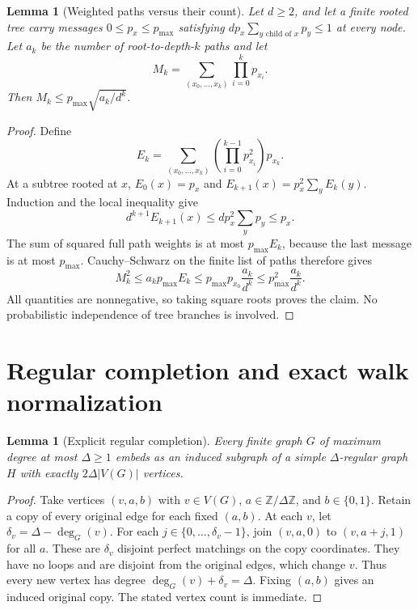 \documentclass[11pt]{article}
\newtheorem{lemma}[theorem]{Lemma}
\theoremstyle{definition}
\begin{document}
\begin{lemma}[Weighted paths versus their count]\label{lem:weighted}
Let $d\ge2$, and let a finite rooted tree carry messages $0\le p_x\le p_{\max}$ satisfying
$d p_x\sum_{y\text{ child of }x}p_y\le1$ at every node. Let $a_k$ be
the number of root-to-depth-$k$ paths and let
\[
 M_k=\sum_{(x_0,\ldots,x_k)}\prod_{i=0}^k p_{x_i}.
\]
Then $M_k\le p_{\max}\sqrt{a_k/d^k}$.
\end{lemma}
\begin{proof}
Define
\[
 E_k=\sum_{(x_0,\ldots,x_k)}
       \left(\prod_{i=0}^{k-1}p_{x_i}^2\right)p_{x_k}.
\]
At a subtree rooted at $x$, $E_0(x)=p_x$ and
$E_{k+1}(x)=p_x^2\sum_y E_k(y)$. Induction and the local inequality give
\[
 d^{k+1}E_{k+1}(x)
 \le d p_x^2\sum_y p_y\le p_x.
\]
The sum of squared full path weights is at most $p_{\max}E_k$, because
the last message is at most $p_{\max}$. Cauchy--Schwarz on the finite
list of paths therefore gives
\[
 M_k^2\le a_k p_{\max}E_k
 \le p_{\max}p_{x_0}\frac{a_k}{d^k}
 \le p_{\max}^2\frac{a_k}{d^k}.
\]
All quantities are nonnegative, so taking square roots proves the claim.
No probabilistic independence of tree branches is involved.
\end{proof}

\section{Regular completion and exact walk normalization}

\begin{lemma}[Explicit regular completion]\label{lem:completion}
Every finite graph $G$ of maximum degree at most $\Delta\ge1$ embeds as
an induced subgraph of a simple $\Delta$-regular graph $H$ with exactly
$2\Delta |V(G)|$ vertices.
\end{lemma}
\begin{proof}
Take vertices $(v,a,b)$ with $v\in V(G)$, $a\in\mathbb Z/\Delta\mathbb Z$,
and $b\in\{0,1\}$. Retain a copy of every original edge for each fixed
$(a,b)$. At each $v$, let $\delta_v=\Delta-\deg_G(v)$. For each
$j\in\{0,\ldots,\delta_v-1\}$, join
$(v,a,0)$ to $(v,a+j,1)$ for all $a$.
These are $\delta_v$ disjoint perfect matchings on the copy coordinates.
They have no loops and are disjoint from the original edges, which change
$v$. Thus every new vertex has degree $\deg_G(v)+\delta_v=\Delta$.
Fixing $(a,b)$ gives an induced original copy. The stated vertex count
is immediate.
\end{proof}
\end{document}
